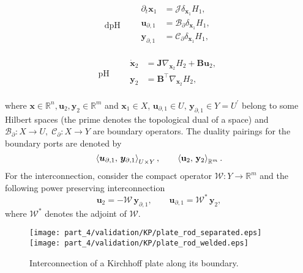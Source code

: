 \noindent
\begin{minipage}{.45\linewidth}
	\begin{equation}
	\text{dpH}\qquad
	\begin{aligned}
	\partial_t \bm{x}_1 &= \mathcal{J} \delta_{\bm{x}_1} {H_1}, \\
	\bm{u}_{\partial, 1}  &= \mathcal{B}_\partial \delta_{\bm{x}_1} {H_1}, \\
	\bm{y}_{\partial, 1} &= \mathcal{C}_\partial \delta_{\bm{x}_1} {H_1}, \\
	\end{aligned}
	\end{equation}
\end{minipage}
\begin{minipage}{.5\linewidth}
	\begin{equation}
	\text{pH} \qquad
	\begin{aligned}
	\dot{\mathbf{x}}_2 &= \mathbf{J} \nabla_{\mathbf{x}_2} {H_2} + \mathbf{B} \mathbf{u}_2, \\
	\mathbf{y}_{2} &= \mathbf{B}^\top \nabla_{\mathbf{x}_2} {H_2}, \\
	\end{aligned}
	\end{equation}
\end{minipage} %

where $\mathbf{x} \in \mathbb{R}^n, \mathbf{u}_2, \mathbf{y}_2 \in \mathbb{R}^m$ and $\bm{x}_1 \in {X}$,  $\bm{u}_{\partial, 1}  \in {U}, \, \bm{y}_{\partial, 1} \in  {Y} = {U}^\prime$ belong to some Hilbert spaces (the prime denotes the topological dual of a space)  and  $\mathcal{B}_\partial: {X} \rightarrow {U}, \; \mathcal{C}_\partial: {X} \rightarrow {Y}$ are boundary operators. The duality pairings for the boundary ports are denoted by
\[
\inner[{U} \times {Y}]{\bm{u}_{\partial, 1}}{\bm{y}_{\partial, 1}},  \qquad
\inner[\mathbb{R}^m]{\mathbf{u}_{2}}{\mathbf{y}_{2}}.
\]
For the interconnection, consider the compact operator $\mathcal{W}: Y \rightarrow \mathbb{R}^m$ and the following power preserving interconnection
\begin{equation}
\label{eq:int_inf}
\mathbf{u}_2 = -\mathcal{W} \, \bm{y}_{\partial, 1},  \qquad \bm{u}_{\partial, 1} = \mathcal{W}^* \, \mathbf{y}_2,
\end{equation}
where $\mathcal{W}^*$ denotes the adjoint of $\mathcal{W}$. 
\begin{figure}[tb]
	\centering
	\texttt{[image: part\_4/validation/KP/plate\_rod\_separated.eps]} 
	\texttt{[image: part\_4/validation/KP/plate\_rod\_welded.eps]} 
	\caption{Interconnection of a Kirchhoff plate along its boundary.}
	\label{fig:sketchRodPlate}
\end{figure}

